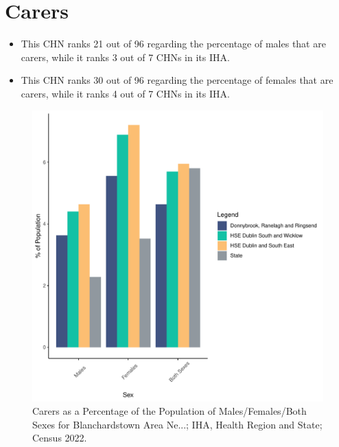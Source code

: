 \documentclass{article}
\begin{document}
\section{Carers}\label{sect:Carers}
\begin{itemize}
\item This CHN ranks  21 out of 96 regarding the percentage of males that are carers, while it ranks   3 out of 7 CHNs in its IHA.
\item This CHN ranks  30 out of 96 regarding the percentage of females that are carers, while it ranks   4 out of 7 CHNs in its IHA.
\end{itemize}
\begin{figure}[H]
	\centering
	\includegraphics[width = 150mm]{../figures/CareED.pdf}
	\caption{Carers as a Percentage of the Population of Males/Females/Both Sexes for Blanchardstown Area Ne...; IHA, Health Region and State; Census 2022.}
	\label{fig:2ae19629-1a6a-13a3-e055-000000000001}
	\end{figure}
\end{document}
